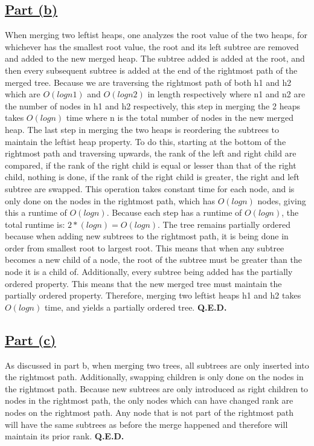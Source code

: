 \documentclass{article}
\begin{document}
\subsection*{\underline{Part (b)}}
When merging two leftist heaps, one analyzes the root value of the two heaps, for whichever has the smallest root value, the root and its left subtree are removed and added to the new merged heap. The subtree added is added at the root, and then every subsequent subtree is added at the end of the rightmost path of the merged tree. Because we are traversing the rightmost path of both h1 and h2 which are $O(logn1)$ and $O(logn2)$ in length respectively where n1 and n2 are the number of nodes in h1 and h2 respectively, this step in merging the 2 heaps takes $O(logn)$ time where n is the total number of nodes in the new merged heap.
The last step in merging the two heaps is reordering the subtrees to maintain the leftist heap property. To do this, starting at the bottom of the rightmost path and traversing upwards, the rank of the left and right child are compared, if the rank of the right child is equal or lesser than that of the right child, nothing is done, if the rank of the right child is greater, the right and left subtree are swapped. This operation takes constant time for each node, and is only done on the nodes in the rightmost path, which has $O(logn)$ nodes, giving this a runtime of $O(logn)$. Because each step has a runtime of $O(logn)$, the total runtime is: $2 * \left(logn\right)=O\left(logn\right)$.
The tree remains partially ordered because when adding new subtrees to the rightmost path, it is being done in order from smallest root to largest root. This means that when any subtree becomes a new child of a node, the root of the subtree must be greater than the node it is a child of. Additionally, every subtree being added has the partially ordered property. This means that the new merged tree must maintain the partially ordered property.
Therefore, merging two leftist heaps h1 and h2 takes $O(logn)$ time, and yields a partially ordered tree. \textbf{Q.E.D.}

\subsection*{\underline{Part (c)}}
As discussed in part b, when merging two trees, all subtrees are only inserted into the rightmost path. Additionally, swapping children is only done on the nodes in the rightmost path. Because new subtrees are only introduced as right children to nodes in the rightmost path, the only nodes which can have changed rank are nodes on the rightmost path. Any node that is not part of the rightmost path will have the same subtrees as before the merge happened and therefore will maintain its prior rank. \textbf{Q.E.D.}
\end{document}
